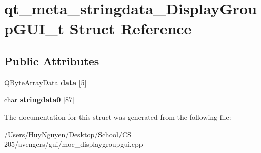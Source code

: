 \hypertarget{structqt__meta__stringdata__DisplayGroupGUI__t}{}\section{qt\+\_\+meta\+\_\+stringdata\+\_\+\+Display\+Group\+G\+U\+I\+\_\+t Struct Reference}
\label{structqt__meta__stringdata__DisplayGroupGUI__t}
\subsection*{Public Attributes}
\begin{DoxyCompactItemize}
\item 
Q\+Byte\+Array\+Data {\bfseries data} \mbox{[}5\mbox{]}\hypertarget{structqt__meta__stringdata__DisplayGroupGUI__t_aa44eb58cd2606401b02b15734958ab68}{}\label{structqt__meta__stringdata__DisplayGroupGUI__t_aa44eb58cd2606401b02b15734958ab68}

\item 
char {\bfseries stringdata0} \mbox{[}87\mbox{]}\hypertarget{structqt__meta__stringdata__DisplayGroupGUI__t_a82c0275a0450baaa635f6bbdc8365c3a}{}\label{structqt__meta__stringdata__DisplayGroupGUI__t_a82c0275a0450baaa635f6bbdc8365c3a}

\end{DoxyCompactItemize}


The documentation for this struct was generated from the following file\+:\begin{DoxyCompactItemize}
\item 
/\+Users/\+Huy\+Nguyen/\+Desktop/\+School/\+C\+S 205/avengers/gui/moc\+\_\+displaygroupgui.\+cpp\end{DoxyCompactItemize}
